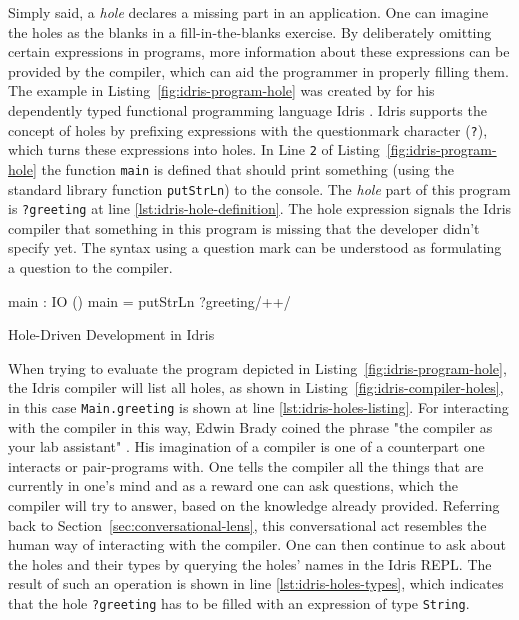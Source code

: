 Simply said, a \emph{hole} declares a missing part in an application.
One can imagine the holes as the blanks in a fill-in-the-blanks exercise.
By deliberately omitting certain expressions in programs, more information about these expressions can be provided by the compiler, which can aid the programmer in properly filling them.
The example in Listing~\ref{fig:idris-program-hole} was created by \citeauthor{brady_type-driven_2017} for his dependently typed functional programming language Idris \cite{brady_type-driven_2017}.
Idris supports the concept of holes by prefixing expressions with the questionmark character (\texttt{?}), which turns these expressions into holes.
In Line \verb|2| of Listing~\ref{fig:idris-program-hole} the function \verb|main| is defined that should print something (using the standard library function \verb|putStrLn|) to the console.
The \emph{hole} part of this program is \verb|?greeting| at line \ref{lst:idris-hole-definition}.
The hole expression signals the Idris compiler that something in this program is missing that the developer didn't specify yet.
The syntax using a question mark can be understood as formulating a question to the compiler.

\begin{program}
\begin{GenericCode}
main : IO ()
main = putStrLn ?greeting/+\label{lst:idris-hole-definition}+/
\end{GenericCode}
\caption{Hole-Driven Development in Idris}
\label{fig:idris-program-hole}
\end{program}

When trying to evaluate the program depicted in Listing~\ref{fig:idris-program-hole}, the Idris compiler will list all holes, as shown in Listing~\ref{fig:idris-compiler-holes}, in this case \texttt{Main.greeting} is shown at line \ref{lst:idris-holes-listing}.
For interacting with the compiler in this way, Edwin Brady coined the phrase "the compiler as your lab assistant" \cite{brady_type-driven_2017}.
His imagination of a compiler is one of a counterpart one interacts or pair-programs with.
One tells the compiler all the things that are currently in one's mind and as a reward one can ask questions, which the compiler will try to answer, based on the knowledge already provided.
Referring back to Section~\ref{sec:conversational-lens}, this conversational act resembles the human way of interacting with the compiler.
One can then continue to ask about the holes and their types by querying the holes' names in the Idris REPL.
The result of such an operation is shown in line \ref{lst:idris-holes-types}, which indicates that the hole \texttt{?greeting} has to be filled with an expression of type \texttt{String}.

